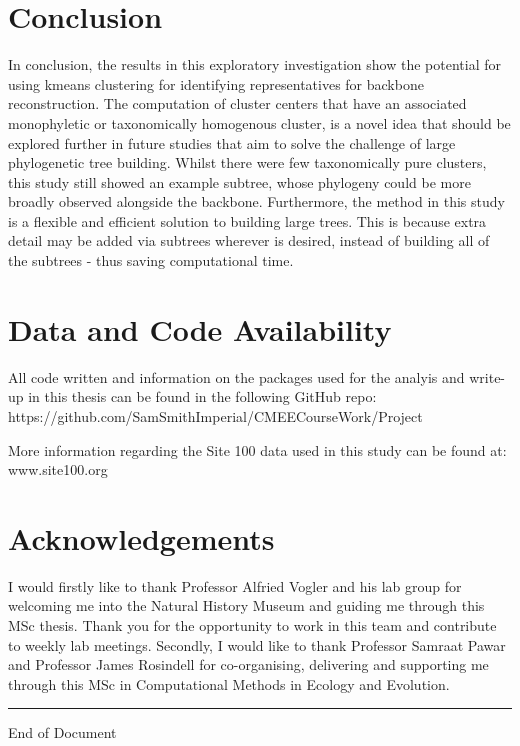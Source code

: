 \documentclass[12pt]{article}
\begin{document}
  \section{Conclusion}

  In conclusion, the results in this exploratory investigation show the potential for using kmeans clustering for identifying representatives for backbone reconstruction. The computation of cluster centers that have an associated monophyletic or taxonomically homogenous cluster, is a novel idea that should be explored further in future studies that aim to solve the challenge of large phylogenetic tree building. Whilst there were few taxonomically pure clusters, this study still showed an example subtree, whose phylogeny could be more broadly observed alongside the backbone. Furthermore, the method in this study is a flexible and efficient solution to building large trees. This is because extra detail may be added via subtrees wherever is desired, instead of building all of the subtrees - thus saving computational time. 

  \section{Data and Code Availability}

  All code written and information on the packages used for the analyis and write-up in this thesis can be found in the following GitHub repo: \\
  https://github.com/SamSmithImperial/CMEECourseWork/Project

  More information regarding the Site 100 data used in this study can be found at: www.site100.org

  \section{Acknowledgements}

  I would firstly like to thank Professor Alfried Vogler and his lab group for welcoming me into the Natural History Museum and guiding me through this MSc thesis. Thank you for the opportunity to work in this team and contribute to weekly lab meetings. Secondly, I would like to thank Professor Samraat Pawar and Professor James Rosindell for co-organising, delivering and supporting me through this MSc in Computational Methods in Ecology and Evolution.

  
  
  

  \rule{\linewidth}{0.1mm}
  \begin{center}
    End of Document
  \end{center}
\end{document}
